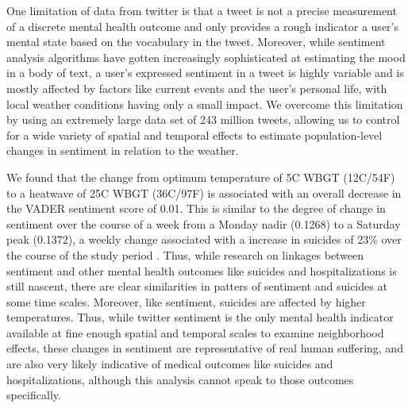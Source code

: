 \documentclass[fleqn,10pt]{wlscirep}
\begin{document}
One limitation of data from twitter is that a tweet is not a precise measurement of a discrete mental health outcome and only provides a rough indicator a user's mental state based on the vocabulary in the tweet.  Moreover, while sentiment analysis algorithms have gotten increasingly sophisticated at estimating the mood in a body of text, a user's expressed sentiment in a tweet is highly variable and is mostly affected by factors like current events and the user's personal life, with local weather conditions having only a small impact.  We overcome this limitation by using an extremely large data set of 243 million tweets, allowing us to control for a wide variety of spatial and temporal effects to estimate population-level changes in sentiment in relation to the weather.

We found that the change from optimum temperature of 5\textdegree C WBGT (12\textdegree C/54\textdegree F) to a heatwave of 25\textdegree C WBGT (36\textdegree C/97\textdegree F) is associated with an overall decrease in the VADER sentiment score of 0.01.  This is similar to the degree of change in sentiment over the course of a week from a Monday nadir (0.1268) to a Saturday peak (0.1372), a weekly change associated with a increase in suicides of 23\% over the course of the study period \cite{CDC2021}.  Thus, while research on linkages between sentiment and other mental health outcomes like suicides and hospitalizations is still nascent, there are clear similarities in patters of sentiment and suicides at some time scales.  Moreover, like sentiment, suicides are affected by higher temperatures.  Thus, while twitter sentiment is the only mental health indicator available at fine enough spatial and temporal scales to examine neighborhood effects, these changes in sentiment are representative of real human suffering, and are also very likely indicative of medical outcomes like suicides and hospitalizations, although this analysis cannot speak to those outcomes specifically.
\end{document}
